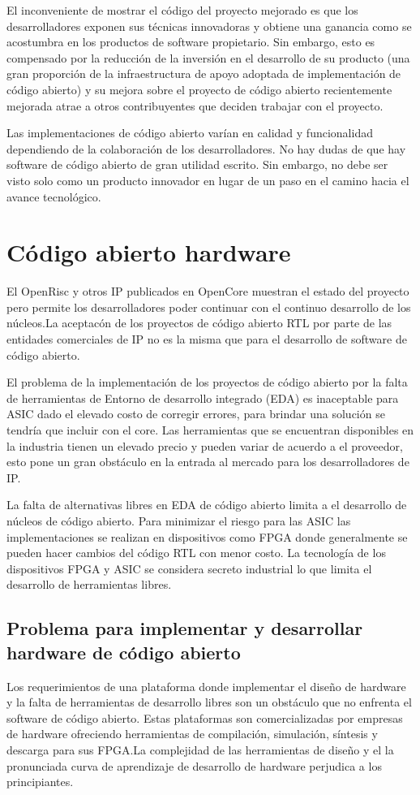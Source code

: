 	El inconveniente de mostrar el código del proyecto mejorado es que los desarrolladores exponen sus técnicas innovadoras y obtiene una ganancia como
	se acostumbra en los productos de software propietario. Sin embargo, esto es compensado por la reducción de la inversión en el desarrollo de su
	producto (una gran proporción de la infraestructura de apoyo adoptada de implementación de código abierto) y su mejora sobre el proyecto de código
	abierto recientemente mejorada atrae a otros contribuyentes que deciden trabajar con el proyecto.

	Las implementaciones de código abierto varían en calidad y funcionalidad dependiendo de la colaboración de los desarrolladores. No hay dudas de que
	hay software de código abierto de gran utilidad escrito. Sin embargo, no debe ser visto solo como un producto innovador en lugar de un paso en el
	camino hacia el avance tecnológico.

\section {Código abierto hardware}
El OpenRisc y otros IP  publicados en OpenCore muestran el estado del proyecto pero permite los desarrolladores poder continuar con el continuo desarrollo de los núcleos.La aceptacón de los proyectos de código abierto RTL por parte de las entidades comerciales de IP no es la misma que para el desarrollo de software de código abierto.

El problema de la implementación de los proyectos de código abierto por la falta de herramientas de Entorno de desarrollo integrado (EDA)  es inaceptable para ASIC dado el elevado costo de corregir errores, para brindar una solución se tendría que incluir con el core. Las herramientas  que se encuentran disponibles en la industria tienen un elevado precio y pueden variar de acuerdo a el proveedor, esto pone un gran obstáculo en la entrada al mercado para los desarrolladores de IP.

La falta de alternativas libres en EDA de código abierto limita a el desarrollo de núcleos de código abierto. Para minimizar el riesgo para las ASIC las implementaciones se realizan en dispositivos como FPGA donde generalmente se pueden hacer cambios del código RTL con menor costo. La tecnología de los dispositivos FPGA y ASIC se considera secreto industrial
lo que limita el desarrollo de herramientas libres.
	\subsection{Problema para implementar y desarrollar hardware de código abierto }
Los requerimientos de una plataforma donde implementar el diseño de hardware y la falta de herramientas de desarrollo libres son un obstáculo que no enfrenta el software de código abierto. Estas plataformas son comercializadas por empresas de hardware ofreciendo herramientas de  compilación, simulación, síntesis y descarga para sus FPGA.La complejidad de las herramientas de diseño y el la pronunciada curva de aprendizaje de desarrollo de hardware perjudica a los principiantes. 

